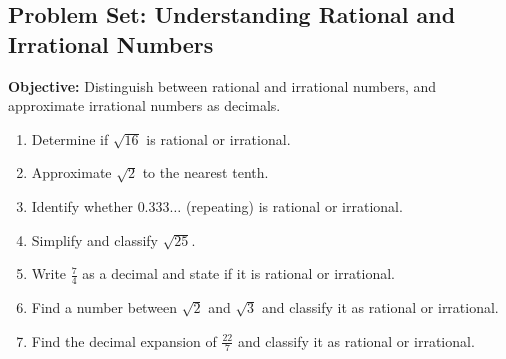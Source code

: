 \documentclass[12pt]{article}
\title{}
\date{}
\begin{document}
\subsection*{Problem Set: Understanding Rational and Irrational Numbers}
\onehalfspacing

\begin{tcolorbox}[colframe=black!40, colback=gray!5, 
coltitle=black, colbacktitle=black!20, fonttitle=\bfseries\Large, 
title=Learning Objective, halign title=center, left=5pt, right=5pt, top=5pt, bottom=15pt]
\textbf{Objective:} Distinguish between rational and irrational numbers, and approximate irrational numbers as decimals.
\end{tcolorbox}

\begin{tcolorbox}[colframe=black!60, colback=white, 
coltitle=black, colbacktitle=black!15, fonttitle=\bfseries\Large, 
title=Exercises, halign title=center, left=10pt, right=10pt, top=10pt, bottom=60pt]
\begin{enumerate}[itemsep=3em]
    \item Determine if \( \sqrt{16} \) is rational or irrational.
    \item Approximate \( \sqrt{2} \) to the nearest tenth.
    \item Identify whether \( 0.333\ldots \) (repeating) is rational or irrational.
    \item Simplify and classify \( \sqrt{25} \).
    \item Write \( \frac{7}{4} \) as a decimal and state if it is rational or irrational.
    \item Find a number between \( \sqrt{2} \) and \( \sqrt{3} \) and classify it as rational or irrational.
      \item Find the decimal expansion of \( \frac{22}{7} \) and classify it as rational or irrational.
\end{enumerate}
\end{tcolorbox}

\vspace{1em}
\end{document}
